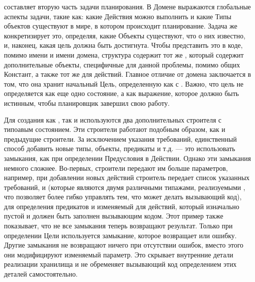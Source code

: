 
 составляет вторую часть задачи планирования.
В Домене выражаются глобальные аспекты задачи,
такие как: какие Действия можно выполнить
и какие Типы объектов существуют в мире, в котором происходит планирование.
Задача же конкретизирует это, определяя, какие Объекты существуют,
что о них известно, и, наконец, какая цель должна быть достигнута.
Чтобы представить это в коде, помимо имени и имени домена,
структура  содержит тот же ,
который содержит дополнительные объекты, специфичные для данной проблемы,
помимо общих Констант, а также тот же  для действий.
Главное отличие от домена заключается в том,
что она хранит начальный 
Цель, определенную как  с .
Важно, что цель не определяется как еще одно состояние,
а как выражение, которое должно быть истинным, чтобы планировщик завершил свою работу.

Для создания как , так и 
используются два дополнительных строителя с типоавым состоянием.
Эти строители работают подобным образом, как и предыдущие строители.
За исключением указания требований,
единственный способ добавить новые типы, объекты, предикаты и т.д.
--- это использовать замыкания, как при определении Предусловия в Действии.
Однако эти замыкания немного сложнее.
Во-первых, строители передают им больше параметров,
например, при добавлении новых действий строитель передает
список указанных требований,  и 
(которые являются двумя различными типажами, реализуемыми ,
что позволяет более гибко управлять тем, что может делать вызывающий код),
 для определения предикатов
и изменяемый  для действий,
который изначально пустой и должен быть заполнен вызывающим кодом.
Этот пример также показывает,
что не все замыкания теперь возвращают результат.
Только при определении Цели используется замыкание,
которое возвращает  или ошибку.
Другие замыкания не возвращают ничего при отсутствии ошибок,
вместо этого они модифицируют изменяемый параметр.
Это скрывает внутренние детали реализации хранилища
и не обременяет вызывающий код определением этих деталей самостоятельно.

